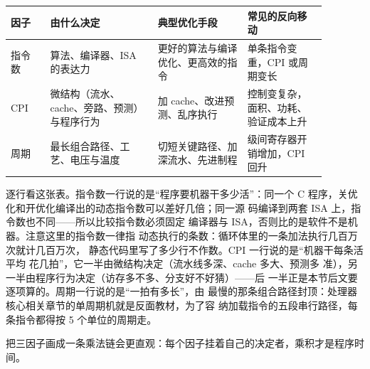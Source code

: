 \begin{longtable}{L{0.11\linewidth}L{0.3\linewidth}L{0.25\linewidth}L{0.22\linewidth}}
\toprule
因子 & 由什么决定 & 典型优化手段 & 常见的反向移动 \\
\midrule
指令数 & 算法、编译器、ISA 的表达力 & 更好的算法与编译优化、更高效的指令 & 单条指令变重，CPI 或周期变长 \\\tablerowrule
CPI & 微结构（流水、cache、旁路、预测）与程序行为 & 加 cache、改进预测、乱序执行 & 控制变复杂，面积、功耗、验证成本上升 \\\tablerowrule
周期 & 最长组合路径、工艺、电压与温度 & 切短关键路径、加深流水、先进制程 & 级间寄存器开销增加，CPI 回升 \\
\bottomrule
\end{longtable}

逐行看这张表。指令数一行说的是“程序要机器干多少活”：同一个
C 程序，关优化和开优化编译出的动态指令数可以差好几倍；同一源
码编译到两套 ISA 上，指令数也不同——所以比较指令数必须固定
编译器与 ISA，否则比的是软件不是机器。注意这里的指令数一律指
动态执行的条数：循环体里的一条加法执行几百万次就计几百万次，
静态代码里写了多少行不作数。CPI 一行说的是“机器干每条活平均
花几拍”，它一半由微结构决定（流水线多深、cache 多大、预测多
准），另一半由程序行为决定（访存多不多、分支好不好猜）——后
一半正是本节后文要逐项算的。周期一行说的是“一拍有多长”，由
最慢的那条组合路径封顶：处理器核心相关章节的单周期机就是反面教材，为了容
纳加载指令的五段串行路径，每条指令都得按 5 个单位的周期走。

把三因子画成一条乘法链会更直观：每个因子挂着自己的决定者，乘积才是程序时间。

